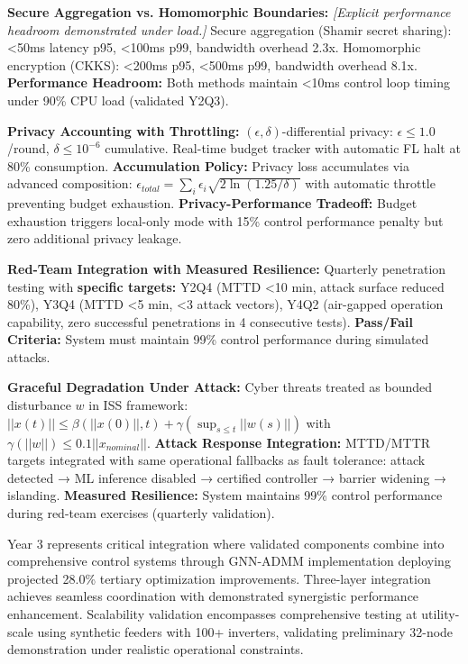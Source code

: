 \documentclass[12pt]{article}
\begin{document}
\textbf{Secure Aggregation vs. Homomorphic Boundaries:} \textit{[Explicit performance headroom demonstrated under load.]} Secure aggregation (Shamir secret sharing): <50ms latency p95, <100ms p99, bandwidth overhead 2.3x. Homomorphic encryption (CKKS): <200ms p95, <500ms p99, bandwidth overhead 8.1x. \textbf{Performance Headroom:} Both methods maintain <10ms control loop timing under 90\% CPU load (validated Y2Q3).

\textbf{Privacy Accounting with Throttling:} $(\epsilon, \delta)$-differential privacy: $\epsilon \leq 1.0$/round, $\delta \leq 10^{-6}$ cumulative. Real-time budget tracker with automatic FL halt at 80\% consumption. \textbf{Accumulation Policy:} Privacy loss accumulates via advanced composition: $\epsilon_{total} = \sum_i \epsilon_i \sqrt{2\ln(1.25/\delta)}$ with automatic throttle preventing budget exhaustion. \textbf{Privacy-Performance Tradeoff:} Budget exhaustion triggers local-only mode with 15\% control performance penalty but zero additional privacy leakage.

\textbf{Red-Team Integration with Measured Resilience:} Quarterly penetration testing with \textbf{specific targets:} Y2Q4 (MTTD <10 min, attack surface reduced 80\%), Y3Q4 (MTTD <5 min, <3 attack vectors), Y4Q2 (air-gapped operation capability, zero successful penetrations in 4 consecutive tests). \textbf{Pass/Fail Criteria:} System must maintain 99\% control performance during simulated attacks.

\textbf{Graceful Degradation Under Attack:} Cyber threats treated as bounded disturbance $w$ in ISS framework: $||x(t)|| \leq \beta(||x(0)||, t) + \gamma(\sup_{s \leq t} ||w(s)||)$ with $\gamma(||w||) \leq 0.1||x_{nominal}||$. \textbf{Attack Response Integration:} MTTD/MTTR targets integrated with same operational fallbacks as fault tolerance: attack detected → ML inference disabled → certified controller → barrier widening → islanding. \textbf{Measured Resilience:} System maintains 99\% control performance during red-team exercises (quarterly validation).

Year 3 represents critical integration where validated components combine into comprehensive control systems through GNN-ADMM implementation deploying projected 28.0\% tertiary optimization improvements. Three-layer integration achieves seamless coordination with demonstrated synergistic performance enhancement. Scalability validation encompasses comprehensive testing at utility-scale using synthetic feeders with 100+ inverters, validating preliminary 32-node demonstration under realistic operational constraints.
\end{document}
